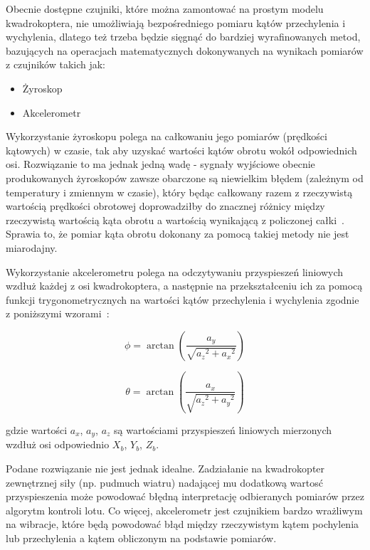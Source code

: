 Obecnie dostępne czujniki, które można zamontować na prostym modelu kwadrokoptera, nie umożliwiają bezpośredniego pomiaru kątów przechylenia i wychylenia, dlatego też trzeba będzie sięgnąć do bardziej wyrafinowanych metod, bazujących na operacjach matematycznych dokonywanych na wynikach pomiarów z czujników takich jak:

\begin{itemize}
	\item Żyroskop
	\item Akcelerometr
\end{itemize} 

Wykorzystanie żyroskopu polega na całkowaniu jego pomiarów (prędkości kątowych) w czasie, tak aby uzyskać wartości kątów obrotu wokół odpowiednich osi. Rozwiązanie to ma jednak jedną wadę - sygnały wyjściowe obecnie produkowanych  żyroskopów zawsze obarczone są niewielkim błędem (zależnym od temperatury i zmiennym w czasie), który będąc całkowany razem z rzeczywistą wartością prędkości obrotowej doprowadziłby do znacznej różnicy między rzeczywistą wartością kąta obrotu a wartością wynikającą z policzonej całki~\cite{quadro9, filters1}. Sprawia to, że pomiar kąta obrotu dokonany za pomocą takiej metody nie jest miarodajny.

Wykorzystanie akcelerometru polega na odczytywaniu przyspieszeń liniowych wzdłuż każdej z osi kwadrokoptera, a następnie na przekształceniu ich za pomocą funkcji trygonometrycznych na wartości kątów przechylenia i wychylenia zgodnie z poniższymi wzorami~\cite{mems5}:

\begin{equation}
	\phi = \arctan(\frac{a_y}{\sqrt{a{_z}^2 + a{_x}^2}})
\end{equation}

\begin{equation}
	\theta = \arctan(\frac{a_x}{\sqrt{a{_z}^2 + a{_y}^2}})
\end{equation}

gdzie wartości $a_x$, $a_y$, $a_z$ są wartościami przyspieszeń liniowych mierzonych wzdłuż osi odpowiednio $X_b$, $Y_b$, $Z_b$.

Podane rozwiązanie nie jest jednak idealne. Zadziałanie na kwadrokopter zewnętrznej siły (np. pudmuch wiatru) nadającej mu dodatkową wartosć przyspieszenia może powodować błędną interpretację odbieranych pomiarów przez algorytm kontroli lotu. Co więcej, akcelerometr jest czujnikiem bardzo wrażliwym na wibracje, które będą powodować błąd między rzeczywistym kątem pochylenia lub przechylenia a kątem obliczonym na podstawie pomiarów.

